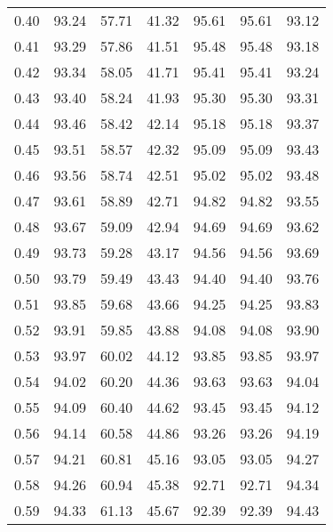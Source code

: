 \begin{tabular}{|c|c|c|c|c|c|c|}
      0.40 &     93.24 &     57.71 &      41.32 &   95.61 &      95.61 &         93.12 \\
      0.41 &     93.29 &     57.86 &      41.51 &   95.48 &      95.48 &         93.18 \\
      0.42 &     93.34 &     58.05 &      41.71 &   95.41 &      95.41 &         93.24 \\
      0.43 &     93.40 &     58.24 &      41.93 &   95.30 &      95.30 &         93.31 \\
      0.44 &     93.46 &     58.42 &      42.14 &   95.18 &      95.18 &         93.37 \\
      0.45 &     93.51 &     58.57 &      42.32 &   95.09 &      95.09 &         93.43 \\
      0.46 &     93.56 &     58.74 &      42.51 &   95.02 &      95.02 &         93.48 \\
      0.47 &     93.61 &     58.89 &      42.71 &   94.82 &      94.82 &         93.55 \\
      0.48 &     93.67 &     59.09 &      42.94 &   94.69 &      94.69 &         93.62 \\
      0.49 &     93.73 &     59.28 &      43.17 &   94.56 &      94.56 &         93.69 \\
      0.50 &     93.79 &     59.49 &      43.43 &   94.40 &      94.40 &         93.76 \\
      0.51 &     93.85 &     59.68 &      43.66 &   94.25 &      94.25 &         93.83 \\
      0.52 &     93.91 &     59.85 &      43.88 &   94.08 &      94.08 &         93.90 \\
      0.53 &     93.97 &     60.02 &      44.12 &   93.85 &      93.85 &         93.97 \\
      0.54 &     94.02 &     60.20 &      44.36 &   93.63 &      93.63 &         94.04 \\
      0.55 &     94.09 &     60.40 &      44.62 &   93.45 &      93.45 &         94.12 \\
      0.56 &     94.14 &     60.58 &      44.86 &   93.26 &      93.26 &         94.19 \\
      0.57 &     94.21 &     60.81 &      45.16 &   93.05 &      93.05 &         94.27 \\
      0.58 &     94.26 &     60.94 &      45.38 &   92.71 &      92.71 &         94.34 \\
      0.59 &     94.33 &     61.13 &      45.67 &   92.39 &      92.39 &         94.43 \\

\end{tabular}
